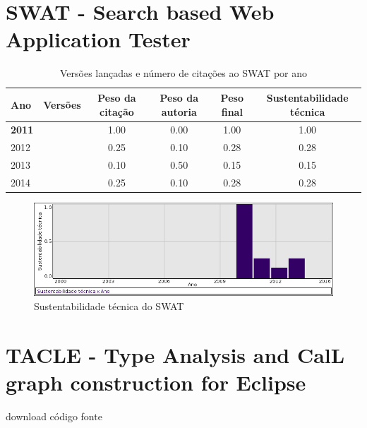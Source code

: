 \section{SWAT - Search based Web Application Tester}


\begin{table}[H]
\caption{Versões lançadas e número de citações ao SWAT por ano}
\centering
\begin{tabular}{| l | c | c | c | c | c |}
  \hline
  Ano & Versões & Peso da citação & Peso da autoria & Peso final & Sustentabilidade técnica \\
  \hline
            {\bf 2011}
          &
          
          &
          1.00
          &
          0.00
          &
          1.00
          &
            {\color{blue} 1.00}
          \\
\hline
            2012
          &
          
          &
          0.25
          &
          0.10
          &
          0.28
          &
            {\color{red} 0.28}
          \\
\hline
            2013
          &
          
          &
          0.10
          &
          0.50
          &
          0.15
          &
            {\color{red} 0.15}
          \\
\hline
            2014
          &
          
          &
          0.25
          &
          0.10
          &
          0.28
          &
            {\color{red} 0.28}
          \\
\hline
\end{tabular}
\end{table}

\begin{figure}[h]
  \center
  \includegraphics[scale=0.50]{imagens/softwares-charts/swat.png}
  \caption{Sustentabilidade técnica do SWAT}
\end{figure}


\section{TACLE - Type Analysis and CalL graph construction for Eclipse}
\checkmark download
\checkmark código fonte


